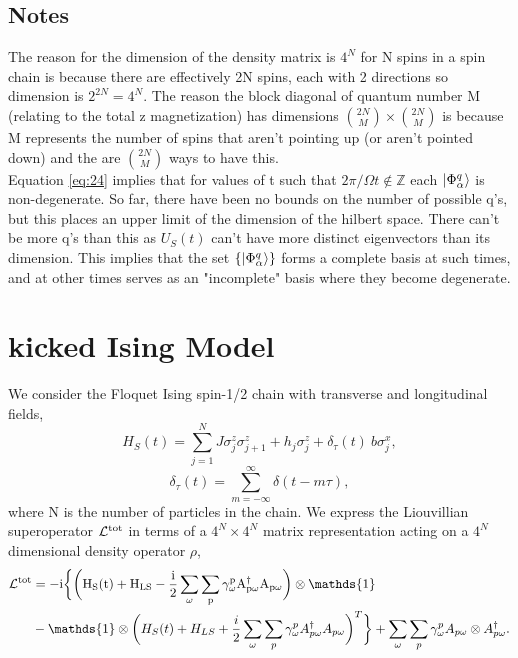 \documentclass[10pt]{article}
\numberwithin{equation}{section}
\begin{document}
\subsection{Notes}
The reason for the dimension of the density matrix is $4^{N}$ for N spins in a spin chain is because there are effectively 2N spins, each with 2 directions so dimension is $2^{2N} = 4^N$. The reason the block diagonal of quantum number M (relating to the total z magnetization) has dimensions ${2N\choose M} \times {2N\choose M}$ is because M represents the number of spins that aren't pointing up (or aren't pointed down) and the are ${2N\choose M}$ ways to have this. \\
Equation \ref{eq:24} implies that for values of t such that $2\pi/\Omega t \not\in \mathbb{Z}$ each $\ket{\Phi_{\alpha}^{q}}$ is non-degenerate. So far, there have been no bounds on the number of possible q's, but this places an upper limit of the dimension of the hilbert space. There can't be more q's than this as $U_{S}(t)$ can't have more distinct eigenvectors than its dimension. This implies that the set $\{\ket{\Phi_{\alpha}^{q}}\}$ forms a complete basis at such times, and at other times serves as an "incomplete" basis where they become degenerate. 



\section{kicked Ising Model}
We consider the Floquet Ising spin-1/2 chain with transverse and longitudinal fields,
\begin{equation}
H_{S}(t) = \sum_{j=1}^N J\sigma_{j}^{z}\sigma_{j+1}^{z} + h_{j}\sigma_{j}^{z} +\delta_{\tau}(t)\:b\sigma_{j}^{x},
\end{equation}
\begin{equation}
\delta_{\tau}(t) = \sum_{m=-\infty}^{\infty} \delta(t-m\tau),
\end{equation}
where N is the number of particles in the chain. We express the Liouvillian superoperator $\mathcal{L}^{\rm tot}$ in terms of a $4^N \times 4^N$ matrix representation acting on a $4^N$ dimensional density operator $\rho$,
\begin{equation} \label{eq:25}
\begin{aligned}
\mathcal{L}^{\rm tot} &= \rm -i\bigg\{\bigg(H_{S}(t)+H_{LS}-\frac{i}{2}\sum_{\omega}\sum_{p}\gamma_{\omega}^{p}A_{p\omega}^{\dagger}A_{p\omega}\bigg)\otimes\mathds{1} \\ 
&-\mathds{1}\otimes\bigg(H_{S}(t)+H_{LS}+\frac{i}{2}\sum_{\omega}\sum_{p}\gamma_{\omega}^{p}A_{p\omega}^{\dagger}A_{p\omega}\bigg)^{T}\bigg\} + \sum_{\omega}\sum_{p}\gamma_{\omega}^{p}A_{p\omega}\otimes A_{p\omega}^{\dagger}.
\end{aligned}
\end{equation}
\end{document}
